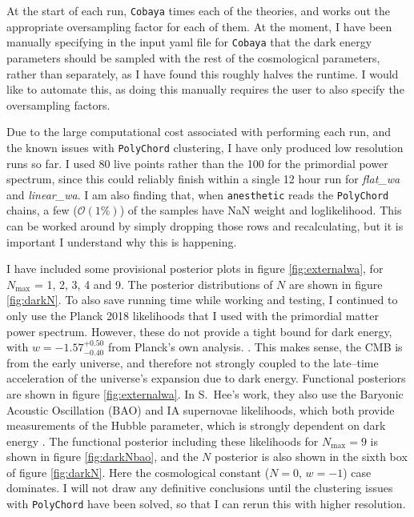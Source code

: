 \documentclass{article}
\begin{document}
At the start of each run, \texttt{Cobaya} times each of the theories, and works out the appropriate oversampling factor for each of them. At the moment, I have been manually specifying in the input yaml file for \texttt{Cobaya} that the dark energy parameters should be sampled with the rest of the cosmological parameters, rather than separately, as I have found this roughly halves the runtime. I would like to automate this, as doing this manually requires the user to also specify the oversampling factors.

Due to the large computational cost associated with performing each run, and the known issues with \texttt{PolyChord} clustering, I have only produced low resolution runs so far. I used 80 live points rather than the 100 for the primordial power spectrum, since this could reliably finish within a single 12 hour run for \textit{flat\_wa} and \textit{linear\_wa}. I am also finding that, when \texttt{anesthetic} reads the \texttt{PolyChord} chains, a few ($\mathcal{O}(1\%)$) of the samples have NaN weight and loglikelihood. This can be worked around by simply dropping those rows and recalculating, but it is important I understand why this is happening. 

I have included some provisional posterior plots in figure \ref{fig:externalwa}, for $N_\textrm{max}$ = 1, 2, 3, 4 and 9. The posterior distributions of $N$ are shown in figure \ref{fig:darkN}. To also save running time while working and testing, I continued to only use the Planck 2018 likelihoods that I used with the primordial matter power spectrum. However, these do not provide a tight bound for dark energy, with $w=-1.57_{-0.40}^{+0.50}$ from Planck's own analysis. \cite{planck_6}. This makes sense, the CMB is from the early universe, and therefore not strongly coupled to the late--time acceleration of the universe's expansion due to dark energy. Functional posteriors are shown in figure \ref{fig:externalwa}. In S.~Hee's work, they also use the Baryonic Acoustic Oscillation (BAO) and IA supernovae likelihoods, which both provide measurements of the Hubble parameter, which is strongly dependent on dark energy \cite{Sonke, BAO1, BAO2, BAO3, SNIa}. The functional posterior including these likelihoods for $N_\textrm{max}=9$ is shown in figure \ref{fig:darkNbao}, and the $N$ posterior is also shown in the sixth box of figure \ref{fig:darkN}. Here the cosmological constant ($N=0$, $w=-1$) case dominates. I will not draw any definitive conclusions until the clustering issues with \texttt{PolyChord} have been solved, so that I can rerun this with higher resolution.
\end{document}
